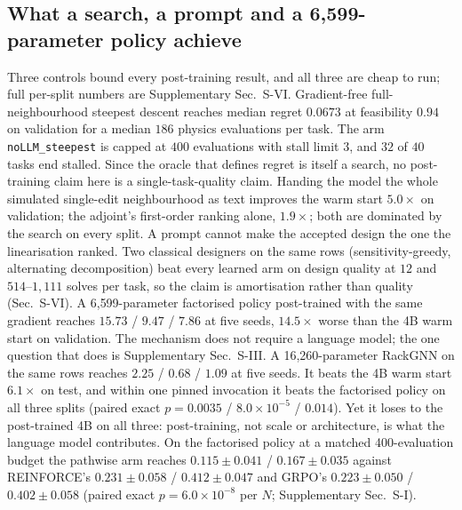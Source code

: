 \documentclass[journal]{IEEEtran}
\begin{document}
\subsection{What a search, a prompt and a 6{,}599-parameter policy achieve}
\label{sec:baselines}

Three controls bound every post-training result, and all three are cheap to run; full per-split numbers are Supplementary
Sec.~S-VI.  Gradient-free full-neighbourhood steepest descent reaches median
regret $0.0673$ at feasibility $0.94$ on validation for a median $186$ physics
evaluations per task.  The arm \texttt{noLLM\_steepest} is capped at $400$ evaluations
with stall limit $3$, and $32$ of $40$ tasks end stalled. Since the oracle that defines regret is itself a
search, no post-training claim here is a single-task-quality claim.  Handing the model the whole simulated single-edit neighbourhood as text improves the
warm start $5.0\times$ on validation; the adjoint's first-order ranking alone, $1.9\times$; both are dominated by the search on every split. A prompt cannot
make the accepted design the one the linearisation ranked.  Two classical designers on the same rows (sensitivity-greedy, alternating
decomposition) beat every learned arm on design quality at $12$ and $514$--$1{,}111$
solves per task, so the claim is amortisation rather than quality (Sec.~S-VI).
A 6{,}599-parameter factorised policy post-trained with the same gradient reaches $15.73$ / $9.47$ /
$7.86$ at five seeds, $14.5\times$ worse than the 4B warm start on validation. The mechanism does not require a language model; the one question that does
is Supplementary Sec.~S-III.  A 16{,}260-parameter RackGNN on the same rows reaches $2.25$ / $0.68$ / $1.09$ at five
seeds.  It beats the 4B warm start $6.1\times$ on test, and within one pinned
invocation it beats the factorised policy on all three splits (paired exact
$p=0.0035$ / $8.0\times10^{-5}$ / $0.014$).  Yet it
loses to the post-trained 4B on all three: post-training, not scale or architecture,
is what the language model contributes.  On the factorised policy at a matched
400-evaluation budget the pathwise arm reaches $0.115\pm0.041$ / $0.167\pm0.035$
against REINFORCE's $0.231\pm0.058$ / $0.412\pm0.047$ and GRPO's $0.223\pm0.050$ /
$0.402\pm0.058$ (paired exact $p=6.0\times10^{-8}$ per $N$; Supplementary Sec.~S-I).
\end{document}
